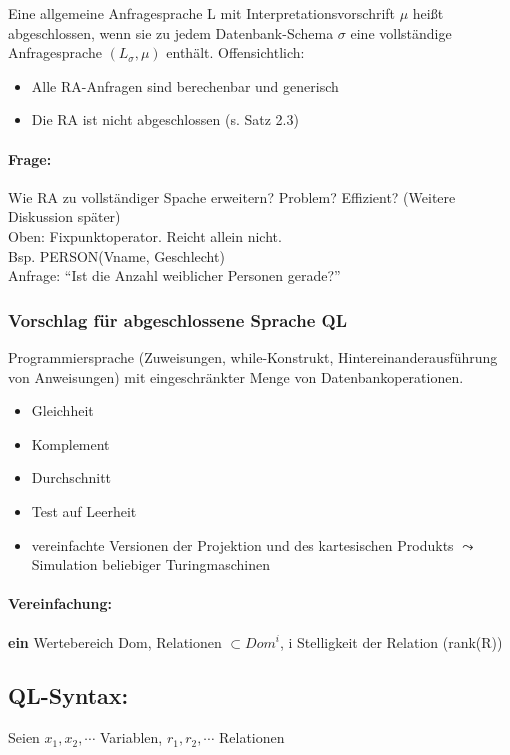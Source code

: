 \documentclass[12pt, a4paper]{article}
\begin{document}
Eine allgemeine Anfragesprache L mit Interpretationsvorschrift $\mu$ heißt abgeschlossen, wenn sie zu jedem Datenbank-Schema $\sigma$ eine vollständige Anfragesprache $(L_\sigma, \mu)$ enthält.
Offensichtlich: 
\begin{itemize}
\item Alle RA-Anfragen sind berechenbar und generisch
\item Die RA ist nicht abgeschlossen (s. Satz 2.3)
\end{itemize}

\paragraph{Frage:} Wie RA zu vollständiger Spache erweitern? Problem? Effizient? (Weitere Diskussion später) \\
Oben: Fixpunktoperator. Reicht allein nicht. \\
Bsp. PERSON(Vname, Geschlecht) \\
Anfrage: ``Ist die Anzahl weiblicher Personen gerade?''

\subsubsection{Vorschlag für abgeschlossene Sprache QL}

Programmiersprache (Zuweisungen, while-Konstrukt, Hintereinanderausführung von Anweisungen) mit eingeschränkter Menge von Datenbankoperationen.

\begin{itemize}
\item Gleichheit
\item Komplement
\item Durchschnitt
\item Test auf Leerheit
\item vereinfachte Versionen der Projektion und des kartesischen Produkts $\leadsto$ Simulation beliebiger Turingmaschinen
\end{itemize}

\paragraph{Vereinfachung:} \textbf{ein} Wertebereich Dom, Relationen $\subset Dom^i$, i Stelligkeit der Relation (rank(R))

\subsection{QL-Syntax:} Seien $x_1, x_2, \cdots$ Variablen, $r_1, r_2, \cdots$ Relationen \\
\end{document}
